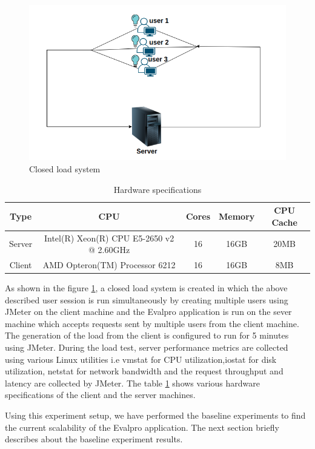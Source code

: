 \documentclass[sigconf]{acmart}
\begin{document}
\begin{figure}[!htb]
  \centering
  \includegraphics[width=\linewidth]{Pictures/closed_loop.png}
  \caption{Closed load system}
  \label{closed_system}
\end{figure}

\begin{table}
  \begin{tabular}{ccccc}
    \toprule
    Type&CPU&Cores&Memory&CPU Cache\\
    \midrule
    Server & Intel(R) Xeon(R) CPU E5-2650 v2 @ 2.60GHz& 16&16GB&20MB\\
    Client & AMD Opteron(TM) Processor 6212 & 16&16GB&8MB\\
  \bottomrule
\end{tabular}
\caption{Hardware specifications}
  \label{tab:hardware}
\end{table}

As shown in the figure  \ref{closed_system}, a closed load system is created in which  the above described user session is run simultaneously by creating multiple users using JMeter  on the client machine and the Evalpro application is run on the sever machine which accepts requests sent by multiple users from the client machine. The generation of the load from the client is configured to run for 5 minutes using JMeter. During the load test, server performance metrics are collected using various Linux utilities i.e vmstat for CPU utilization,iostat for disk utilization, netstat for network bandwidth and the request throughput and latency are collected by JMeter. The table \ref{tab:hardware} shows various hardware specifications of the client and the server machines.

Using this experiment setup, we have performed the baseline experiments to find the current scalability of the Evalpro application. The next section briefly describes about the baseline experiment results.
\end{document}

